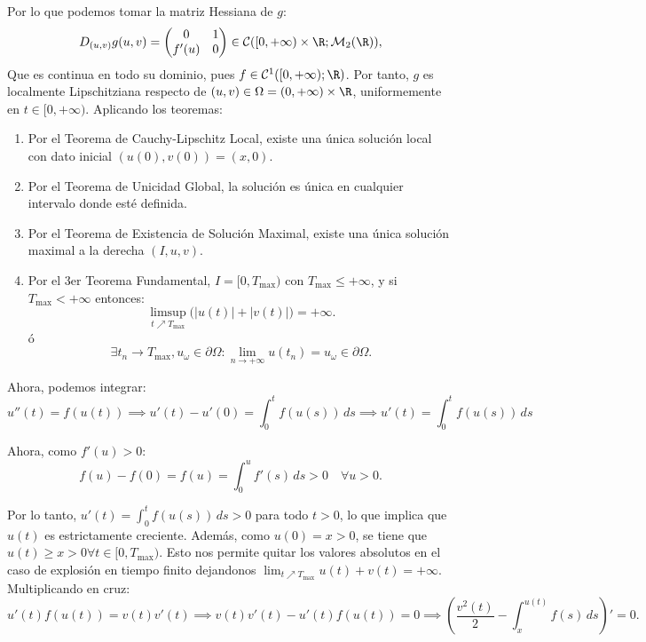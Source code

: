 {    Por lo que podemos tomar la matriz Hessiana de $g$:
    \[
        D_{(u,v)} g(u, v) = \begin{pmatrix} 0 & 1 \\ f'(u) & 0 \end{pmatrix} \in \mathcal{C}([0, +\infty) \times \R; \mathcal{M}_2(\R)),
    \]
    Que es continua en todo su dominio, pues $f \in \mathcal{C}^1([0, +\infty); \R)$. Por tanto, $g$ es localmente Lipschitziana respecto de $(u, v) \in \Omega = (0, +\infty) \times \R$, uniformemente en $t \in [0, +\infty)$. Aplicando los teoremas:
    \begin{enumerate}[label=\Roman*)]
        \item Por el Teorema de Cauchy-Lipschitz Local, existe una única solución local con dato inicial $(u(0), v(0)) = (x, 0)$.
        \item Por el Teorema de Unicidad Global, la solución es única en cualquier intervalo donde esté definida.
        \item Por el Teorema de Existencia de Solución Maximal, existe una única solución maximal a la derecha $(I, u, v)$.
        \item Por el 3er Teorema Fundamental, $I = [0, T_{\max})$ con $T_{\max} \le +\infty$, y si $T_{\max} < +\infty$ entonces:
        \[
            \limsup_{t \nearrow T_{\max}} \big( |u(t)| + |v(t)| \big) = +\infty.
        \]
        ó
        \[
            \exists t_n \to T_{\max}, u_{\omega} \in \partial \Omega : 
            \lim_{n \to +\infty} u(t_n) = u_{\omega} \in \partial \Omega.
        \]
    \end{enumerate}

    Ahora, podemos integrar:
    \[
        u''(t) = f(u(t)) \implies
        u'(t) - u'(0) = \int_0^t f(u(s)) \, ds \implies
        u'(t) = \int_0^t f(u(s)) \, ds
    \]

    Ahora, como $f'(u) > 0$:
    \[
        f(u) - f(0) = f(u) = \int_0^u f'(s) \, ds > 0 \quad \forall u > 0.
    \]
    
    Por lo tanto, $u'(t) = \int_0^t f(u(s)) \, ds > 0$ para todo $t > 0$, lo que implica que $u(t)$ es estrictamente creciente. Además, como $u(0) = x > 0$, se tiene que $u(t) \geq x > 0 \forall t \in [0, T_{\max})$. Esto nos permite quitar los valores absolutos en el caso de explosión en tiempo finito dejandonos $\lim_{t \nearrow T_{\max}} u(t) + v(t) = +\infty$. Multiplicando en cruz:
    \[
        u'(t) f(u(t)) = v(t) v'(t) \implies
        v(t) v'(t) - u'(t) f(u(t)) = 0 \implies
        \left( \frac{v^2(t)}{2} - \int_x^{u(t)} f(s) \, ds \right)' = 0.
    \]

}
